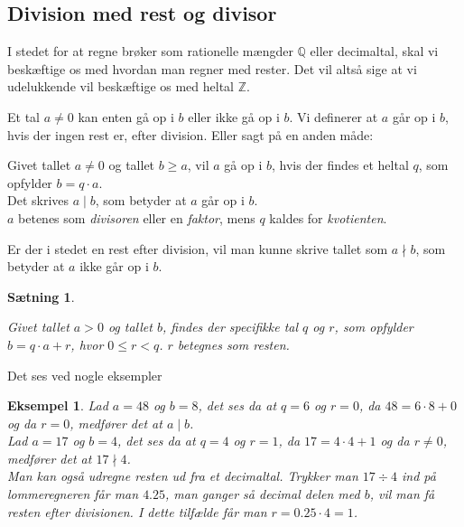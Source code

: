 \documentclass[a4paper, 12pt]{article}
\theoremstyle{break}
\newtheorem{eks}[definition]{Eksempel}
\theoremstyle{breakline}
\newtheorem{sentence}[definition]{Sætning}
\newenvironment{sent}
    {\begin{sentence}\mbox{}\begin{adjustwidth}{1em}{1em}}
    {\end{adjustwidth}\par\noindent\hrulefill\end{sentence}}
\begin{document}
    \subsection{Division med rest og divisor}
    I stedet for at regne brøker som rationelle mængder \(\mathbb{Q}\) eller decimaltal, skal vi beskæftige os med hvordan man regner med rester.
    Det vil altså sige at vi udelukkende vil beskæftige os med heltal \(\mathbb{Z}\).

    Et tal \(a \neq 0\) kan enten gå op i \(b\) eller ikke gå op i \(b\).
    Vi definerer at \(a\) går op i \(b\), hvis der ingen rest er, efter division. Eller sagt på en anden måde:


    \begin{definition}
        \label{heldiv}
        Givet tallet \(a \neq 0\) og tallet \(b \geq a\), vil \(a\) gå op i \(b\),
        hvis der findes et heltal \(q\), som opfylder \(b = q \cdot a\).\\
        Det skrives \(a \mid b\), som betyder at \(a\) går op i \(b\).\\
        \(a\) betenes som \textit{divisoren} eller en \textit{faktor},
        mens \(q\) kaldes for \textit{kvotienten}.\cite[70]{krypto}
    \end{definition}

    Er der i stedet en rest efter division, vil man kunne skrive tallet som \(a \nmid b\), som betyder at \(a\) ikke går op i \(b\).

    \begin{sent}
        \label{rest}
        Givet tallet \(a > 0\) og tallet \(b\), findes der specifikke tal \(q\) og \(r\), som opfylder \(b = q \cdot a + r\), hvor \(0 \leq r < q\). \(r\) betegnes som \textit{resten}.
    \end{sent}

    Det ses ved nogle eksempler

    \begin{eks}
        Lad \(a = 48\) og \(b = 8\), det ses da at \(q = 6\) og \(r = 0\), da \(48 = 6 \cdot 8 + 0\) og da \(r = 0\), medfører det at \(a \mid b\).\\

        Lad \(a = 17\) og \(b = 4\), det ses da at \(q = 4\) og \(r = 1\), da \(17 = 4 \cdot 4 + 1\) og da \(r \neq 0\), medfører det at \(17 \nmid 4\).\\

        Man kan også udregne resten ud fra et decimaltal.
        Trykker man \(17 \div 4\) ind på lommeregneren får man \(4.25\), man ganger så decimal delen med \(b\), vil man få resten efter divisionen.
        I dette tilfælde får man \(r = 0.25 \cdot 4 = 1\).
    \end{eks}
\end{document}
